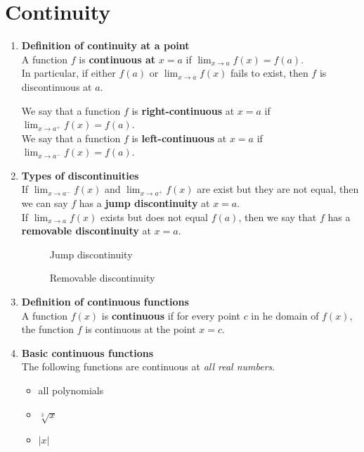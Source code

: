 \section{Continuity}
\begin{enumerate}
  \item \textbf{Definition of continuity at a point}\\
    \indent A function \(f\) is \textbf{continuous at} \(x=a\) if \(\lim_{x\to a}f(x)=f(a)\).\\
    \indent In particular, if either \(f(a)\) or \(\lim_{x\to a} f(x)\) fails to exist, then \(f\) is discontinuous at \(a\).\par
    \indent We say that a function \(f\) is \textbf{right-continuous} at \(x=a\) if \(\lim_{x\to a^+}f(x)=f(a)\).\\
    \indent We say that a function \(f\) is \textbf{left-continuous} at \(x=a\) if \(\lim_{x\to a^-}f(x)=f(a)\).
  \item \textbf{Types of discontinuities}\\
    \indent If \(\lim_{x\to a^-}f(x)\) and \(\lim_{x\to a^+}f(x)\) are exist but they are not equal, then we can say \(f\) has a \textbf{jump discontinuity} at \(x=a\).\\
    \indent If \(\lim_{x\to a}f(x)\) exists but does not equal \(f(a)\), then we say that \(f\) has a \textbf{removable discontinuity} at \(x=a\).
    \begin{figure}[H]
      \centering
      \caption{Jump discontinuity}
      \end{figure}
    \begin{figure}[H]
      \centering
      \caption{Removable discontinuity}
    \end{figure}
  \item \textbf{Definition of continuous functions}\\
   \indent A function \(f(x)\) is \textbf{continuous} if for every point \(c\) in he domain of \(f(x)\), the function \(f\) is continuous at the point \(x=c\).
  \item \textbf{Basic continuous functions}\\
    \indent The following functions are continuous at \textit{all real numbers}.
    \begin{itemize}
      \item all polynomials
      \item \(\sqrt[3]{x}\) 
      \item \(\lvert x\rvert\)

\end{itemize}
\end{enumerate}
